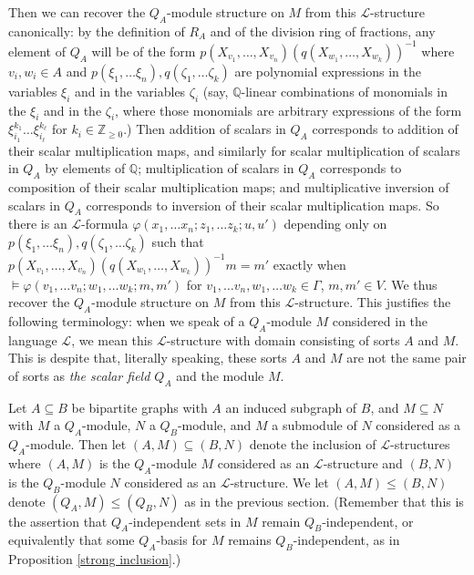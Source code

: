 \documentclass{amsart}
\theoremstyle{definition}
\theoremstyle{remark}
\numberwithin{equation}{section}
\begin{document}
Then we can recover the $Q_{A}$-module structure on $M$ from this $\mathcal{L}$-structure canonically: by the definition of $R_{A}$ and of the division ring of fractions, any element of $Q_{A}$ will be of the form $p(X_{v_{1}}, \ldots, X_{v_{n}})(q(X_{w_{1}}, \ldots, X_{w_{k}}))^{-1}$ where $v_{i}, w_{i} \in A$ and $p(\xi_{1}, \ldots \xi_{n}), q(\zeta_{1}, \ldots \zeta_{k})$ are polynomial expressions in the variables $\xi_{i}$ and in the variables $\zeta_{i}$ (say, $\mathbb{Q}$-linear combinations of monomials in the $\xi_{i}$ and in the $\zeta_{i}$, where those monomials are arbitrary expressions of the form $\xi^{k_{1}}_{i_{1}} \ldots \xi^{k_{\ell}}_{i_{\ell}}$ for $k_{i} \in \mathbb{Z}_{\geq 0}$.) Then addition of scalars in $Q_{A}$ corresponds to addition of their scalar multiplication maps, and similarly for scalar multiplication of scalars in $Q_{A}$ by elements of $\mathbb{Q}$; multiplication of scalars in $Q_{A}$ corresponds to composition of their scalar multiplication maps; and multiplicative inversion of scalars in $Q_{A}$ corresponds to inversion of their scalar multiplication maps. So there is an $\mathcal{L}$-formula $\varphi(x_{1}, \ldots x_{n}; z_{1}, \ldots z_{k}; u, u')$ depending only on $p(\xi_{1}, \ldots \xi_{n}), q(\zeta_{1}, \ldots \zeta_{k})$ such that $p(X_{v_{1}}, \ldots, X_{v_{n}})(q(X_{w_{1}}, \ldots, X_{w_{k}}))^{-1}m=m'$ exactly when $\models \varphi(v_{1}, \ldots v_{n}; w_{1}, \ldots w_{k}; m, m')$ for $v_{1}, \ldots v_{n}, w_{1}, \ldots w_{k}\in \Gamma$, $m, m' \in V$. We thus recover the $Q_{A}$-module structure on $M$ from this $\mathcal{L}$-structure. This justifies the following terminology: when we speak of a $Q_{A}$-module $M$ considered in the language $\mathcal{L}$, we mean this $\mathcal{L}$-structure with domain consisting of sorts $A$ and $M$. This is despite that, literally speaking, these sorts $A$ and $M$ are not the same pair of sorts as \textit{the scalar field $Q_{A}$} and the module $M$.

Let $A \subseteq B$ be bipartite graphs with $A$ an induced subgraph of $B$, and $M \subseteq N$ with $M$ a $Q_{A}$-module, $N$ a $Q_{B}$-module, and $M$ a submodule of $N$ considered as a $Q_{A}$-module. Then let $(A, M) \subseteq (B, N)$ denote the inclusion of $\mathcal{L}$-structures where $(A, M)$ is the $Q_{A}$-module $M$ considered as an $\mathcal{L}$-structure and $(B, N)$ is the $Q_{B}$-module $N$ considered as an $\mathcal{L}$-structure. We let $(A, M) \leq (B, N)$ denote $(Q_{A}, M) \leq (Q_{B}, N)$ as in the previous section. (Remember that this is the assertion that $Q_{A}$-independent sets in $M$ remain $Q_{B}$-independent, or equivalently that some $Q_{A}$-basis for $M$ remains $Q_{B}$-independent, as in Proposition \ref{strong inclusion}.)
\end{document}
